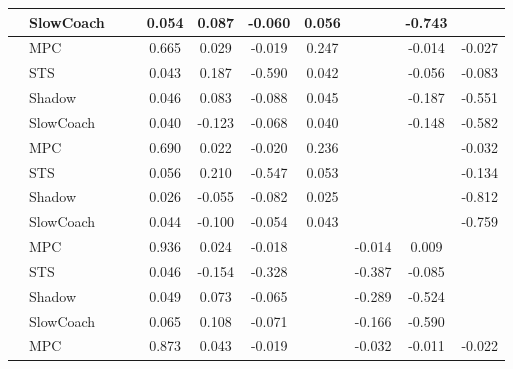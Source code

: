 \begin{tabular}{|l|l|*{9}{c|}}
                                                           & SlowCoach &       &        &     0.054 &  0.087 & -0.060 &  0.056 &      &  -0.743 &       \\
\midrule
[False, False, True, True, True, True, False, True, True] & MPC &       &        &     0.665 &  0.029 & -0.019 &  0.247 &      &  -0.014 &   -0.027 \\
                                                           & STS &       &        &     0.043 &  0.187 & -0.590 &  0.042 &      &  -0.056 &   -0.083 \\
                                                           & Shadow &       &        &     0.046 &  0.083 & -0.088 &  0.045 &      &  -0.187 &   -0.551 \\
                                                           & SlowCoach &       &        &     0.040 & -0.123 & -0.068 &  0.040 &      &  -0.148 &   -0.582 \\
\midrule
[False, False, True, True, True, True, False, False, True] & MPC &       &        &     0.690 &  0.022 & -0.020 &  0.236 &      &      &   -0.032 \\
                                                           & STS &       &        &     0.056 &  0.210 & -0.547 &  0.053 &      &      &   -0.134 \\
                                                           & Shadow &       &        &     0.026 & -0.055 & -0.082 &  0.025 &      &      &   -0.812 \\
                                                           & SlowCoach &       &        &     0.044 & -0.100 & -0.054 &  0.043 &      &      &   -0.759 \\
\midrule
[False, False, True, True, True, False, True, True, False] & MPC &       &        &     0.936 &  0.024 & -0.018 &     &  -0.014 &   0.009 &       \\
                                                           & STS &       &        &     0.046 & -0.154 & -0.328 &     &  -0.387 &  -0.085 &       \\
                                                           & Shadow &       &        &     0.049 &  0.073 & -0.065 &     &  -0.289 &  -0.524 &       \\
                                                           & SlowCoach &       &        &     0.065 &  0.108 & -0.071 &     &  -0.166 &  -0.590 &       \\
\midrule
[False, False, True, True, True, False, True, True, True] & MPC &       &        &     0.873 &  0.043 & -0.019 &     &  -0.032 &  -0.011 &   -0.022 \\

\end{tabular}
